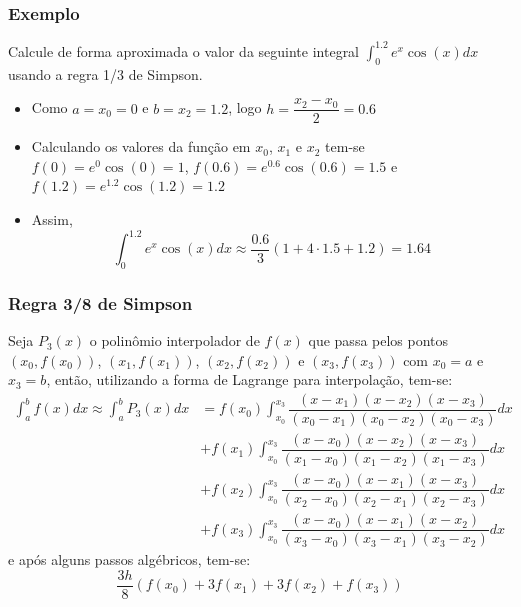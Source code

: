 \documentclass{beamer}
\theoremstyle{mystyle}
\begin{document}
	\begin{frame}
		\frametitle{Exemplo}
		Calcule de forma aproximada o valor da seguinte integral $ \int_{0}^{1.2} e^{x}\cos(x) dx $ usando a regra 1/3 de Simpson.
		\pause
		
		\begin{itemize}
			\item  Como $ a = x_{0} = 0 $ e $ b = x_{2} = 1.2 $, logo $ h = \dfrac{x_{2} - x_{0}}{2} = 0.6$
			\item  Calculando os valores da função em $ x_{0} $, $ x_{1} $ e $ x_{2} $ tem-se $ f(0)  = e^{0}\cos(0) = 1 $, $ f(0.6)  = e^{0.6}\cos(0.6) = 1.5 $ e $ f(1.2)  = e^{1.2}\cos(1.2) = 1.2 $
			\item Assim,
			\begin{equation*}
				\int_{0}^{1.2} e^{x}\cos(x) dx \approx \dfrac{0.6}{3}\left( 1 + 4\cdot1.5 + 1.2 \right) = 1.64
			\end{equation*}
		\end{itemize}
	\end{frame}

	\begin{frame}
		\frametitle{Regra 3/8 de Simpson}
		Seja $ P_{3} (x) $ o polinômio interpolador de $ f (x) $ que passa pelos pontos $ (x_{0} , f (x_{0})) $, $ (x_{1} , f (x_{1})) $, $ (x_{2} , f (x_{2})) $ e $ (x_{3} , f (x_{3})) $  com $ x_{0} = a $ e $ x_{3} = b $, então, utilizando a forma de Lagrange para interpolação, tem-se:
		\begin{align*}
			\int_{a}^{b} f(x) dx \approx \int_{a}^{b} P_{3}(x) dx
			&= f(x_{0})\int_{x_{0}}^{x_{3}} \dfrac{(x - x_{1})(x - x_{2})(x - x_{3})}{(x_{0} - x_{1})(x_{0} - x_{2})(x_{0} - x_{3})} dx\\
			&+ f(x_{1})\int_{x_{0}}^{x_{3}} \dfrac{(x - x_{0})(x - x_{2})(x - x_{3})}{(x_{1} - x_{0})(x_{1} - x_{2})(x_{1} - x_{3})} dx\\
			&+ f(x_{2})\int_{x_{0}}^{x_{3}} \dfrac{(x - x_{0})(x - x_{1})(x - x_{3})}{(x_{2} - x_{0})(x_{2} - x_{1})(x_{2} - x_{3})} dx\\
			&+ f(x_{3})\int_{x_{0}}^{x_{3}} \dfrac{(x - x_{0})(x - x_{1})(x - x_{2})}{(x_{3} - x_{0})(x_{3} - x_{1})(x_{3} - x_{2})} dx
		\end{align*}
		e após alguns passos algébricos, tem-se:
		\begin{equation*}
			\dfrac{3h}{8}(f(x_{0}) + 3f(x_{1}) + 3f(x_{2}) + f(x_{3}))
		\end{equation*}
	\end{frame}
	
\end{document}

